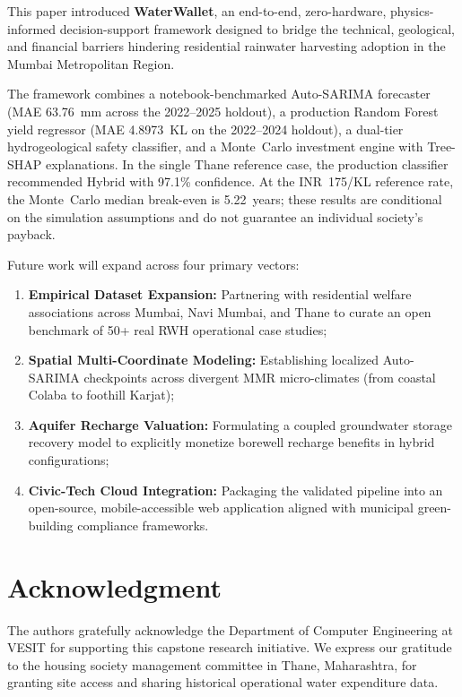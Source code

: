 ﻿\documentclass[conference]{IEEEtran}
\begin{document}
This paper introduced \textbf{WaterWallet}, an end-to-end, zero-hardware, physics-informed decision-support framework designed to bridge the technical, geological, and financial barriers hindering residential rainwater harvesting adoption in the Mumbai Metropolitan Region. 

The framework combines a notebook-benchmarked Auto-SARIMA forecaster (MAE 63.76~mm across the 2022--2025 holdout), a production Random Forest yield regressor (MAE 4.8973~KL on the 2022--2024 holdout), a dual-tier hydrogeological safety classifier, and a Monte~Carlo investment engine with Tree-SHAP explanations. In the single Thane reference case, the production classifier recommended Hybrid with 97.1\% confidence. At the INR~175/KL reference rate, the Monte~Carlo median break-even is 5.22~years; these results are conditional on the simulation assumptions and do not guarantee an individual society's payback.

Future work will expand across four primary vectors:
\begin{enumerate}
  \item \textbf{Empirical Dataset Expansion:} Partnering with residential welfare associations across Mumbai, Navi Mumbai, and Thane to curate an open benchmark of 50+ real RWH operational case studies;
  \item \textbf{Spatial Multi-Coordinate Modeling:} Establishing localized Auto-SARIMA checkpoints across divergent MMR micro-climates (from coastal Colaba to foothill Karjat);
  \item \textbf{Aquifer Recharge Valuation:} Formulating a coupled groundwater storage recovery model to explicitly monetize borewell recharge benefits in hybrid configurations;
  \item \textbf{Civic-Tech Cloud Integration:} Packaging the validated pipeline into an open-source, mobile-accessible web application aligned with municipal green-building compliance frameworks.
\end{enumerate}

\section*{Acknowledgment}
The authors gratefully acknowledge the Department of Computer Engineering at VESIT for supporting this capstone research initiative. We express our gratitude to the housing society management committee in Thane, Maharashtra, for granting site access and sharing historical operational water expenditure data.
\end{document}
